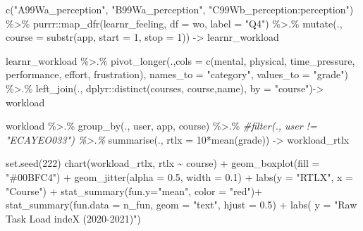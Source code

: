 \documentclass[
]{article}
\newenvironment{Shaded}{\begin{snugshade}}{\end{snugshade}}
\newcommand{\AttributeTok}[1]{\textcolor[rgb]{0.77,0.63,0.00}{#1}}
\newcommand{\CommentTok}[1]{\textcolor[rgb]{0.56,0.35,0.01}{\textit{#1}}}
\newcommand{\DecValTok}[1]{\textcolor[rgb]{0.00,0.00,0.81}{#1}}
\newcommand{\FloatTok}[1]{\textcolor[rgb]{0.00,0.00,0.81}{#1}}
\newcommand{\FunctionTok}[1]{\textcolor[rgb]{0.00,0.00,0.00}{#1}}
\newcommand{\NormalTok}[1]{#1}
\newcommand{\OtherTok}[1]{\textcolor[rgb]{0.56,0.35,0.01}{#1}}
\newcommand{\SpecialCharTok}[1]{\textcolor[rgb]{0.00,0.00,0.00}{#1}}
\newcommand{\StringTok}[1]{\textcolor[rgb]{0.31,0.60,0.02}{#1}}
\begin{document}
\begin{Shaded}
\begin{Highlighting}[]
\FunctionTok{c}\NormalTok{(}\StringTok{"A99Wa\_perception"}\NormalTok{, }\StringTok{"B99Wa\_perception"}\NormalTok{, }\StringTok{"C99Wb\_perception:perception"}\NormalTok{) }\SpecialCharTok{\%\textgreater{}\%}
\NormalTok{  purrr}\SpecialCharTok{::}\FunctionTok{map\_dfr}\NormalTok{(learnr\_feeling, }\AttributeTok{df =}\NormalTok{ wo, }\AttributeTok{label =} \StringTok{"Q4"}\NormalTok{) }\SpecialCharTok{\%\textgreater{}.\%}
  \FunctionTok{mutate}\NormalTok{(., }\AttributeTok{course =} \FunctionTok{substr}\NormalTok{(app, }\AttributeTok{start =} \DecValTok{1}\NormalTok{, }\AttributeTok{stop =} \DecValTok{1}\NormalTok{)) }\OtherTok{{-}\textgreater{}}\NormalTok{ learnr\_workload}

\NormalTok{learnr\_workload }\SpecialCharTok{\%\textgreater{}.\%}
  \FunctionTok{pivot\_longer}\NormalTok{(.,}\AttributeTok{cols =} \FunctionTok{c}\NormalTok{(mental, physical, time\_pressure, performance, effort, frustration),}
  \AttributeTok{names\_to =} \StringTok{"category"}\NormalTok{, }\AttributeTok{values\_to =} \StringTok{"grade"}\NormalTok{)  }\SpecialCharTok{\%\textgreater{}.\%}
  \FunctionTok{left\_join}\NormalTok{(., dplyr}\SpecialCharTok{::}\FunctionTok{distinct}\NormalTok{(courses, course,name), }\AttributeTok{by =} \StringTok{"course"}\NormalTok{)}\OtherTok{{-}\textgreater{}}\NormalTok{ workload}

\NormalTok{workload }\SpecialCharTok{\%\textgreater{}.\%}
  \FunctionTok{group\_by}\NormalTok{(., user, app, course) }\SpecialCharTok{\%\textgreater{}.\%}
  \CommentTok{\#filter(., user != "ECAYEO033") \%\textgreater{}.\%}
  \FunctionTok{summarise}\NormalTok{(., }\AttributeTok{rtlx =} \DecValTok{10}\SpecialCharTok{*}\FunctionTok{mean}\NormalTok{(grade)) }\OtherTok{{-}\textgreater{}}\NormalTok{ workload\_rtlx}

\FunctionTok{set.seed}\NormalTok{(}\DecValTok{222}\NormalTok{)}
\FunctionTok{chart}\NormalTok{(workload\_rtlx, rtlx }\SpecialCharTok{\textasciitilde{}}\NormalTok{ course) }\SpecialCharTok{+}
  \FunctionTok{geom\_boxplot}\NormalTok{(}\AttributeTok{fill =} \StringTok{"\#00BFC4"}\NormalTok{) }\SpecialCharTok{+}
  \FunctionTok{geom\_jitter}\NormalTok{(}\AttributeTok{alpha =} \FloatTok{0.5}\NormalTok{, }\AttributeTok{width =} \FloatTok{0.1}\NormalTok{) }\SpecialCharTok{+}
  \FunctionTok{labs}\NormalTok{(}\AttributeTok{y =} \StringTok{"RTLX"}\NormalTok{, }\AttributeTok{x =} \StringTok{"Course"}\NormalTok{) }\SpecialCharTok{+}
  \FunctionTok{stat\_summary}\NormalTok{(}\AttributeTok{fun.y=}\StringTok{"mean"}\NormalTok{, }\AttributeTok{color =} \StringTok{"red"}\NormalTok{)}\SpecialCharTok{+}
  \FunctionTok{stat\_summary}\NormalTok{(}\AttributeTok{fun.data =}\NormalTok{ n\_fun, }\AttributeTok{geom =} \StringTok{"text"}\NormalTok{, }\AttributeTok{hjust =} \FloatTok{0.5}\NormalTok{) }\SpecialCharTok{+}
  \FunctionTok{labs}\NormalTok{( }\AttributeTok{y =} \StringTok{"Raw Task Load indeX (2020{-}2021)"}\NormalTok{)}
\end{Highlighting}
\end{Shaded}
\end{document}

